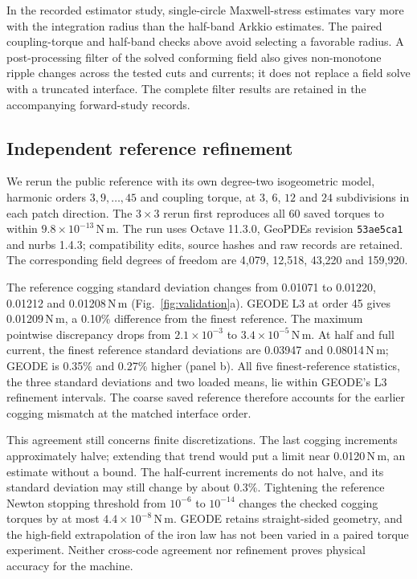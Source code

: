 \documentclass{anvil-paper}
\begin{document}
In the recorded estimator study, single-circle Maxwell-stress estimates
vary more with the integration radius than the half-band Arkkio estimates.
The paired coupling-torque and half-band checks above avoid selecting a
favorable radius. A post-processing filter of the solved conforming field
also gives non-monotone ripple changes across the tested cuts and currents;
it does not replace a field solve with a truncated interface. The complete
filter results are retained in the accompanying forward-study records.

\subsection{Independent reference refinement}\label{sec:refinement}
We rerun the public reference with its own degree-two isogeometric model,
harmonic orders $3,9,\ldots,45$ and coupling torque, at $3$, $6$, $12$ and
$24$ subdivisions in each patch direction. The $3\times3$ rerun first
reproduces all 60 saved torques to within $9.8\times10^{-13}$\,N\,m.
The run uses Octave 11.3.0, GeoPDEs revision \texttt{53ae5ca1} and nurbs
1.4.3; compatibility edits, source hashes and raw records are retained.
The corresponding field degrees of freedom are 4,079, 12,518, 43,220
and 159,920.

The reference cogging standard deviation changes from 0.01071 to 0.01220,
0.01212 and 0.01208\,N\,m (Fig.~\ref{fig:validation}a). GEODE L3 at order
45 gives 0.01209\,N\,m, a 0.10\% difference from the finest reference.
The maximum pointwise discrepancy drops from $2.1\times10^{-3}$ to
$3.4\times10^{-5}$\,N\,m. At half and full current, the finest reference
standard deviations are 0.03947 and 0.08014\,N\,m; GEODE is 0.35\% and
0.27\% higher (panel b). All five finest-reference statistics, the three
standard deviations and two loaded means, lie within GEODE's L3
refinement intervals. The coarse saved reference therefore accounts for
the earlier cogging mismatch at the matched interface order.

This agreement still concerns finite discretizations. The last cogging
increments approximately halve; extending that trend would put a limit
near 0.0120\,N\,m, an estimate without a bound. The half-current increments
do not halve, and its standard deviation may still change by about 0.3\%.
Tightening the reference Newton stopping threshold from $10^{-6}$ to
$10^{-14}$ changes the checked cogging torques by at most
$4.4\times10^{-8}$\,N\,m. GEODE retains straight-sided geometry, and the
high-field extrapolation of the iron law has not been varied in a paired
torque experiment. Neither cross-code agreement nor refinement proves
physical accuracy for the machine.
\end{document}

